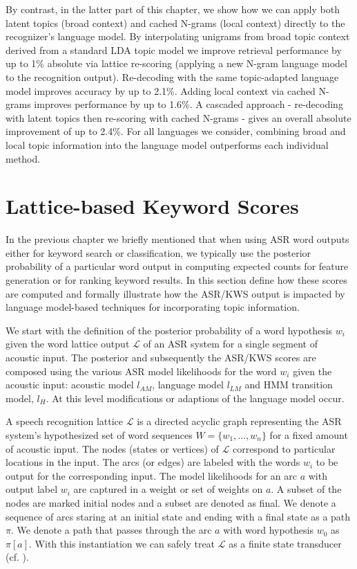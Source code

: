 By contrast, in the latter part of this chapter, we show how we can apply both latent topics (broad context) and cached N-grams (local context) directly to the recognizer's language model.  By interpolating unigrams from broad topic context derived from a standard LDA topic model\cite{blei2003latent,steyvers2007} we improve retrieval performance by up to 1\% absolute via lattice re-scoring (applying a new N-gram language model to the recognition output).  Re-decoding with the same topic-adapted language model improves accuracy by up to 2.1\%.  Adding local context via cached N-grams improves performance by up to 1.6\%.  A cascaded approach - re-decoding with latent topics then re-scoring with cached N-grams - gives an overall absolute improvement of up to 2.4\%.  For all languages we consider, combining broad and local topic information into the language model outperforms each individual method.

\section{Lattice-based Keyword Scores}
\label{sec:scores}
In the previous chapter we briefly mentioned that when using ASR word outputs either for keyword search or classification, we typically use the posterior probability of a particular word output in computing expected counts for feature generation or for ranking keyword results.  In this section define how these scores are computed and formally illustrate how the ASR/KWS output is impacted by language model-based techniques for incorporating topic information.

We start with the definition of the posterior probability of a word hypothesis $w_i$ given the word lattice output $\mathcal{L}$ of an ASR system for a single segment of acoustic input.  The posterior and subsequently the ASR/KWS scores are composed using the various ASR model likelihoods for the word $w_i$ given the acoustic input: acoustic model $l_{AM}$, language model $l_{LM}$ and HMM transition model, $l_{H}$.  At this level modifications or adaptions of the language model occur.  

A speech recognition lattice $\mathcal{L}$ is a directed acyclic graph representing the ASR system's hypothesized set of word sequences $W=\{w_1,...,w_n\}$ for a fixed amount of acoustic input.  The nodes (states or vertices) of $\mathcal{L}$ correspond to particular locations in the input.  The arcs (or edges) are labeled with the words $w_i$ to be output for the corresponding input.  The model likelihoods for an arc $a$ with output label $w_i$ are captured in a weight or set of weights on $a$.  A subset of the nodes are marked initial nodes and a subset are denoted as final.  We denote a sequence of arcs staring at an initial state and ending with a final state as a path $\pi$.  We denote a path that passes through the arc $a$ with word hypothesis $w_0$ as $\pi[a]$.  With this instantiation we can safely treat $\mathcal{L}$ as a finite state transducer (cf. \cite{povey2012}).

